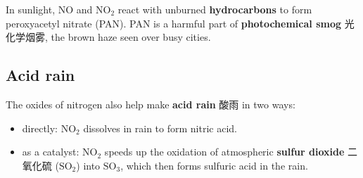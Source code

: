 \documentclass[11pt]{article}
\begin{document}
In sunlight, $\text{NO}$ and $\text{NO}_2$ react with unburned \textbf{hydrocarbons} to form peroxyacetyl nitrate (PAN). PAN is a harmful part of \textbf{photochemical smog} 光化学烟雾, the brown haze seen over busy cities.

\subsection*{Acid rain}

The oxides of nitrogen also help make \textbf{acid rain} 酸雨 in two ways:

\begin{itemize}
\item directly: $\text{NO}_2$ dissolves in rain to form nitric acid.

\item as a catalyst: $\text{NO}_2$ speeds up the oxidation of atmospheric \textbf{sulfur dioxide} 二氧化硫 ($\text{SO}_2$) into $\text{SO}_3$, which then forms sulfuric acid in the rain.

\end{itemize}
\end{document}
